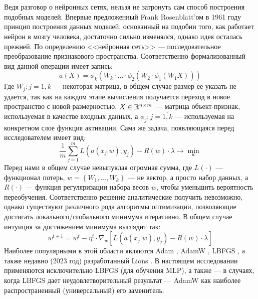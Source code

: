 \\\\
\indent Ведя разговор о нейронных сетях, нельзя не затронуть сам способ построения подобных моделей. Впервые предложенный Frank Rosenblatt'ом \cite{rosenblatt1961principles}  в 1961 году принцип построения данных моделей, основанный на подобии того, как работает нейрон в мозгу человека, достаточно сильно изменялся, однако идея осталась прежней. По определению <<нейронная сеть>> --- последовательное преобразование признакового пространства. Соответственно формализованный вид данной операции имеет запись:
\begin{equation}
	a(X) = \phi_k(W_k \cdot \ldots \cdot \phi_2(W_2 \cdot \phi_1(W_1 X)))
\end{equation}
Где $W_j: j = \overline{1, k}$ --- некоторая матрица, в общем случае размер ее указать не удается, так как на каждом этапе вычисления получается переход в новое пространство с новой размерностью, $X \in \mathbb{R}^{n \times m}$ --- матрица объект-признак, используемая в качестве входных данных, а $\phi_j : j = \overline{1, k}$ --- используемая на конкретном слое функция активации. Сама же задача, появляющаяся перед исследователем имеет вид:
\begin{equation}
	\frac{1}{m} \sum_{j = 1}^m L(a(x_j | w), y_j) - R(w) \cdot \lambda \to \min_{w}
\end{equation}
Перед нами в общем случае невыпуклая огромная сумма, где $L(\cdot)$ --- функционал потерь, $w = \left\{W_1, \ldots, W_k\right\}$ --- не вектор, а просто набор данных, а $R(\cdot)$ --- функция регуляризации набора весов $w$, чтобы уменьшить вероятность переобучения. Соответственно решение аналитические получить невозможно, однако существуют различного рода алгоритмы оптимизации, позволяющие достигать локального/глобального минимума итеративно. В общем случае интуиция за достижением минимума выглядит так:
\begin{equation}
	w^{t + 1} = w^t - \eta^t \cdot \nabla_w \left[L(a(x_j | w), y_j) - R(w) \cdot \lambda\right]
\end{equation}
Наиболее популярными в этой области являются Adam \cite{kingma2014adam}, AdamW \cite{bock2018improvement}, LBFGS \cite{liu1989limited}, а также недавно (2023 год) разработанный Lions \cite{chen2023symbolic}. В настоящем исследовании применяются исключительно LBFGS (для обучения MLP), а также --- в случаях, когда LBFGS дает неудовлетворительный результат --- AdamW как наиболее распространенный (универсальный) его заменитель.

